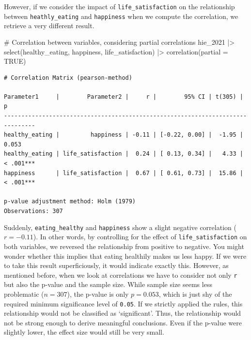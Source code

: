 \documentclass[
  letterpaper,
]{krantz}
\makeatletter
\newenvironment{Shaded}{\begin{snugshade}}{\end{snugshade}}
\newcommand{\AttributeTok}[1]{\textcolor[rgb]{0.40,0.45,0.13}{#1}}
\newcommand{\CommentTok}[1]{\textcolor[rgb]{0.37,0.37,0.37}{#1}}
\newcommand{\ConstantTok}[1]{\textcolor[rgb]{0.56,0.35,0.01}{#1}}
\newcommand{\FunctionTok}[1]{\textcolor[rgb]{0.28,0.35,0.67}{#1}}
\newcommand{\NormalTok}[1]{\textcolor[rgb]{0.00,0.23,0.31}{#1}}
\newcommand{\SpecialCharTok}[1]{\textcolor[rgb]{0.37,0.37,0.37}{#1}}
\newenvironment{kframe}{%
\medskip{}
\setlength{\fboxsep}{.8em}
 \def\at@end@of@kframe{}%
 \ifinner\ifhmode%
  \def\at@end@of@kframe{\end{minipage}}%
  \begin{minipage}{\columnwidth}%
 \fi\fi%
 \def\FrameCommand##1{\hskip\@totalleftmargin \hskip-\fboxsep
 \colorbox{shadecolor}{##1}\hskip-\fboxsep
     \hskip-\linewidth \hskip-\@totalleftmargin \hskip\columnwidth}%
 \MakeFramed {\advance\hsize-\width
   \@totalleftmargin\z@ \linewidth\hsize
   \@setminipage}}%
 {\par\unskip\endMakeFramed%
 \at@end@of@kframe}
\renewenvironment{Shaded}{\begin{kframe}}{\end{kframe}}
\makeatother
\begin{document}
However, if we consider the impact of \texttt{life\_satisfaction} on the
relationship between \texttt{heathly\_eating} and \texttt{happiness}
when we compute the correlation, we retrieve a very different result.

\begin{Shaded}
\begin{Highlighting}[]
\CommentTok{\# Correlation between variables, considering partial correlations}
\NormalTok{hie\_2021 }\SpecialCharTok{|\textgreater{}}
  \FunctionTok{select}\NormalTok{(healthy\_eating, happiness, life\_satisfaction) }\SpecialCharTok{|\textgreater{}}
  \FunctionTok{correlation}\NormalTok{(}\AttributeTok{partial =} \ConstantTok{TRUE}\NormalTok{)}
\end{Highlighting}
\end{Shaded}

\begin{verbatim}
# Correlation Matrix (pearson-method)

Parameter1     |        Parameter2 |     r |        95% CI | t(305) |         p
-------------------------------------------------------------------------------
healthy_eating |         happiness | -0.11 | [-0.22, 0.00] |  -1.95 | 0.053    
healthy_eating | life_satisfaction |  0.24 | [ 0.13, 0.34] |   4.33 | < .001***
happiness      | life_satisfaction |  0.67 | [ 0.61, 0.73] |  15.86 | < .001***

p-value adjustment method: Holm (1979)
Observations: 307
\end{verbatim}

Suddenly, \texttt{eating\_healthy} and \texttt{happiness} show a slight
negative correlation (\(r = -0.11\)). In other words, by controlling for
the effect of \texttt{life\_satisfaction} on both variables, we reversed
the relationship from positive to negative. You might wonder whether
this implies that eating healthily makes us less happy. If we were to
take this result superficiously, it would indicate exactly this.
However, as mentioned before, when we look at correlations we have to
consider not only \texttt{r} but also the p-value and the sample size.
While sample size seems less problematic (\(n = 307\)), the p-value is
only \(p = 0.053\), which is just shy of the required minimum
significance level of \texttt{0.05}. If we strictly applied the rules,
this relationship would not be classified as `significant'. Thus, the
relationship would not be strong enough to derive meaningful
conclusions. Even if the p-value were slightly lower, the effect size
would still be very small.
\end{document}

